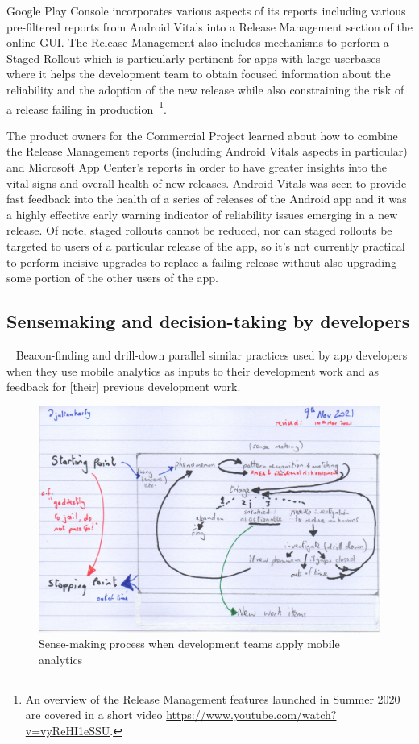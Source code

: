 Google Play Console incorporates various aspects of its reports including various pre-filtered reports from Android Vitals into a Release Management section of the online GUI. The Release Management also includes mechanisms to perform a Staged Rollout which is particularly pertinent for apps with large userbases where it helps the development team to obtain focused information about the reliability and the adoption of the new release while also constraining the risk of a release failing in production~\footnote{An overview of the Release Management features launched in Summer 2020 are covered in a short video \url{https://www.youtube.com/watch?v=vyReHI1eSSU}.}. 

The product owners for the Commercial Project learned about how to combine the Release Management reports (including Android Vitals aspects in particular) and Microsoft App Center's reports in order to have greater insights into the vital signs and overall health of new releases. Android Vitals was seen to provide fast feedback into the health of a series of releases of the Android app and it was a highly effective early warning indicator of reliability issues emerging in a new release. Of note, staged rollouts cannot be reduced, nor can staged rollouts be targeted to users of a particular release of the app, so it's not currently practical to perform incisive upgrades to replace a failing release without also upgrading some portion of the other users of the app.

\subsection{Sensemaking and decision-taking by developers}~\label{aiu-sensemaking-and-decision-taking-by-developers-section}
Beacon-finding and drill-down parallel similar practices used by app developers when they use mobile analytics as inputs to their development work and as feedback for [their] previous development work.

\begin{figure}
    \centering
    \includegraphics[width=15cm]{images/rough-sketches/practical-sense-making-process-10-nov-2021.jpeg}
    \caption{Sense-making process when development teams apply mobile analytics}
    \label{fig:practical-sense-making-process-when-dev-teams-apply-mobile-analytics}
\end{figure}


